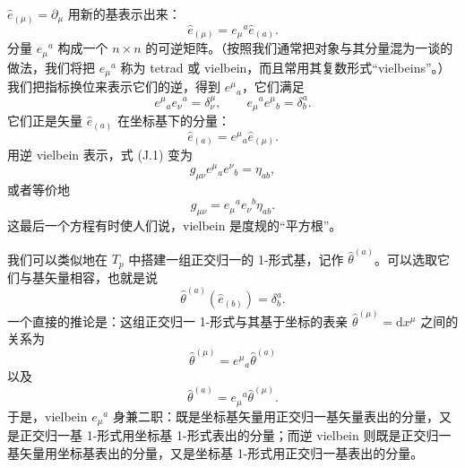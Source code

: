 $\hat{e}_{(\mu)} = \partial_{\mu}$ 用新的基表示出来：
\begin{equation*}
\hat{e}_{(\mu)} = e_{\mu}{}^{a}\hat{e}_{(a)}.
\tag{J.2}
\end{equation*}
分量 $e_{\mu}{}^{a}$ 构成一个 $n\times n$ 的可逆矩阵。（按照我们通常把对象与其分量混为一谈的做法，我们将把 $e_{\mu}{}^{a}$ 称为 tetrad 或 vielbein，而且常用其复数形式“vielbeins”。）我们把指标换位来表示它们的逆，得到 $e^{\mu}{}_{a}$，它们满足
\begin{equation*}
e^{\mu}{}_{a}e_{\nu}{}^{a} = \delta^{\mu}_{\nu}, \qquad e_{\mu}{}^{a}e^{\mu}{}_{b} = \delta^{a}_{b}.
\tag{J.3}
\end{equation*}
它们正是矢量 $\hat{e}_{(a)}$ 在坐标基下的分量：
\begin{equation*}
\hat{e}_{(a)} = e^{\mu}{}_{a}\hat{e}_{(\mu)}.
\tag{J.4}
\end{equation*}
用逆 vielbein 表示，式 (J.1) 变为
\begin{equation*}
g_{\mu\nu}e^{\mu}{}_{a}e^{\nu}{}_{b} = \eta_{ab},
\tag{J.5}
\end{equation*}
或者等价地
\begin{equation*}
g_{\mu\nu} = e_{\mu}{}^{a}e_{\nu}{}^{b}\eta_{ab}.
\tag{J.6}
\end{equation*}
这最后一个方程有时使人们说，vielbein 是度规的“平方根”。

我们可以类似地在 $T_{p}$ 中搭建一组正交归一的 1-形式基，记作 $\hat{\theta}^{(a)}$。可以选取它们与基矢量相容，也就是说
\begin{equation*}
\hat{\theta}^{(a)}(\hat{e}_{(b)}) = \delta^{a}_{b}.
\tag{J.7}
\end{equation*}
一个直接的推论是：这组正交归一 1-形式与其基于坐标的表亲 $\hat{\theta}^{(\mu)} = \mathrm{d}x^{\mu}$ 之间的关系为
\begin{equation*}
\hat{\theta}^{(\mu)} = e^{\mu}{}_{a}\hat{\theta}^{(a)}
\tag{J.8}
\end{equation*}
以及
\begin{equation*}
\hat{\theta}^{(a)} = e_{\mu}{}^{a}\hat{\theta}^{(\mu)}.
\tag{J.9}
\end{equation*}
于是，vielbein $e_{\mu}{}^{a}$ 身兼二职：既是坐标基矢量用正交归一基矢量表出的分量，又是正交归一基 1-形式用坐标基 1-形式表出的分量；而逆 vielbein 则既是正交归一基矢量用坐标基表出的分量，又是坐标基 1-形式用正交归一基表出的分量。

